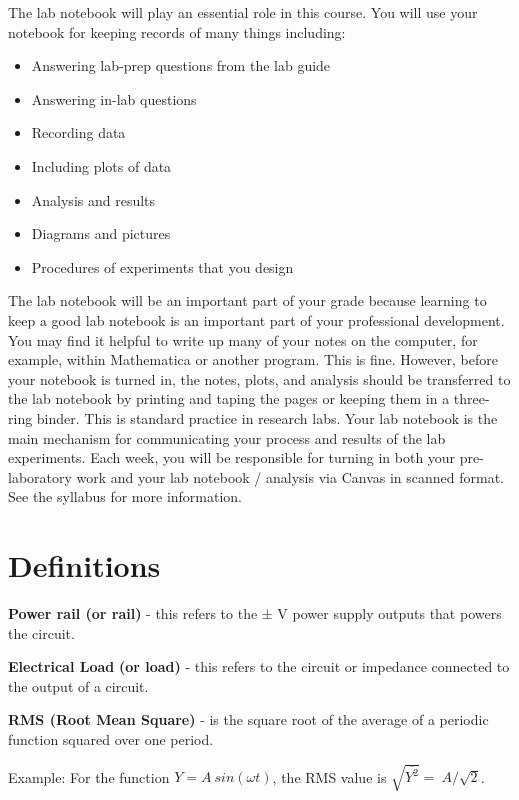 \documentclass[10pt]{PhysLab1C} %
\begin{document}
The lab notebook will play an essential role in this course. You will
use your notebook for keeping records of many things including:

\begin{itemize}
\item
  Answering lab-prep questions from the lab guide
\item
  Answering in-lab questions
\item
  Recording data
\item
  Including plots of data
\item
  Analysis and results
\item
  Diagrams and pictures
\item
  Procedures of experiments that you design
\end{itemize}

The lab notebook will be an important part of your grade because
learning to keep a good lab notebook is an important part of your
professional development. You may find it helpful to write up many of
your notes on the computer, for example, within Mathematica or another
program. This is fine. However, before your notebook is turned in, the
notes, plots, and analysis should be transferred to the lab notebook by
printing and taping the pages or keeping them in a three-ring binder.
This is standard practice in research labs. Your lab notebook is the
main mechanism for communicating your process and results of the lab
experiments. Each week, you will be responsible for turning in both your
pre-laboratory work and your lab notebook / analysis via Canvas in
scanned format. See the syllabus for more information. 


\section{Definitions}

\textbf{Power rail (or rail)} - this refers to the ± V power supply
outputs that powers the circuit.

\textbf{Electrical Load} \textbf{(or load)} - this refers to the circuit
or impedance connected to the output of a circuit.

\textbf{RMS (Root Mean Square)} - is the square root of the average of a
periodic function squared over one period.

\begin{center}
    Example: For the function \(Y = A\ sin(\omega t)\), the RMS value is
\(\sqrt{\overline{Y^{2}}} =\ A/\sqrt{2}\).
\end{center} 
\end{document}
